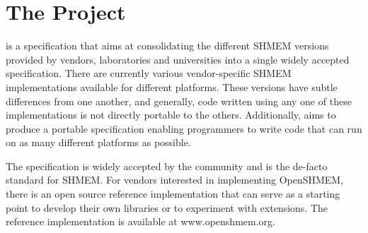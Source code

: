 
\section{The \openshmem{} Project}

\openshmem{} is a specification that aims at consolidating the different
SHMEM versions provided by vendors, laboratories and universities 
into a single widely accepted specification. There are currently various vendor-specific SHMEM implementations available for
different platforms. These versions have subtle differences from one
another, and generally, code written using any one of these
implementations is not directly portable to the others. Additionally, \openshmem{} aims
to produce a portable specification enabling programmers to write
\openshmem{} code that can run on as many different platforms
as possible.

The \openshmem{} specification is widely accepted by the community and is the de-facto
standard for SHMEM.  For vendors interested in implementing OpenSHMEM, there is an open source reference implementation
that can serve as a starting point to develop their own libraries or to experiment with extensions. The reference implementation is available at www.openshmem.org.

